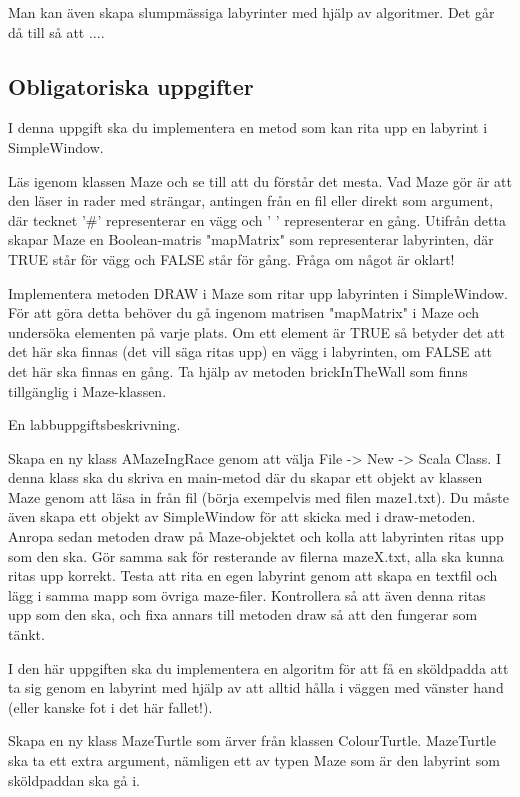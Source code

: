 Man kan även skapa slumpmässiga labyrinter med hjälp av algoritmer. Det går då till så att ....


\subsection{Obligatoriska uppgifter}

\Task I denna uppgift ska du implementera en metod som kan rita upp en labyrint i SimpleWindow.

\Subtask Läs igenom klassen Maze och se till att du förstår det mesta. Vad Maze gör är att den läser in rader med strängar, antingen från en fil eller direkt som argument, där tecknet '#' representerar en vägg och ' ' representerar en gång. Utifrån detta skapar Maze en Boolean-matris "mapMatrix" som representerar labyrinten, där TRUE står för vägg och FALSE står för gång. Fråga om något är oklart!

\Subtask Implementera metoden DRAW i Maze som ritar upp labyrinten i SimpleWindow. För att göra detta behöver du gå ingenom matrisen "mapMatrix" i Maze och undersöka elementen på varje plats. Om ett element är TRUE så betyder det att det här ska finnas (det vill säga ritas upp) en vägg i labyrinten, om FALSE att det här ska finnas en gång. Ta hjälp av metoden brickInTheWall som finns tillgänglig i Maze-klassen.

\Task En labbuppgiftsbeskrivning.

\Subtask Skapa en ny klass AMazeIngRace genom att välja File -> New -> Scala Class. I denna klass ska du skriva en main-metod där du skapar ett objekt av klassen Maze genom att läsa in från fil (börja exempelvis med filen maze1.txt). Du måste även skapa ett objekt av SimpleWindow för att skicka med i draw-metoden. Anropa sedan metoden draw på Maze-objektet och kolla att labyrinten ritas upp som den ska. Gör samma sak för resterande av filerna mazeX.txt, alla ska kunna ritas upp korrekt. Testa att rita en egen labyrint genom att skapa en textfil och lägg i samma mapp som övriga maze-filer. Kontrollera så att även denna ritas upp som den ska, och fixa annars till metoden draw så att den fungerar som tänkt.

\Task I den här uppgiften ska du implementera en algoritm för att få en sköldpadda att ta sig genom en labyrint med hjälp av att alltid hålla i väggen med vänster hand (eller kanske fot i det här fallet!).

\Subtask Skapa en ny klass MazeTurtle som ärver från klassen ColourTurtle. MazeTurtle ska ta ett extra argument, nämligen ett av typen Maze som är den labyrint som sköldpaddan ska gå i.

